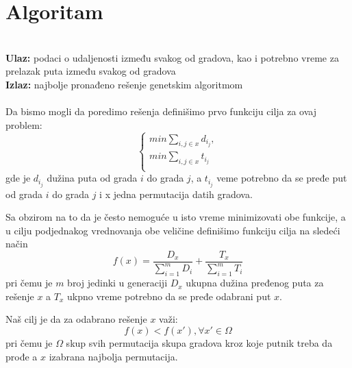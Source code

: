 \documentclass[a4paper]{article}
\begin{document}
\section{Algoritam}
\\
\textbf{Ulaz:} podaci o udaljenosti između svakog od gradova, kao i potrebno vreme za prelazak puta između svakog od gradova
\\
\textbf{Izlaz:} najbolje pronađeno rešenje genetskim algoritmom
\\
\\
Da bismo mogli da poredimo rešenja definišimo prvo funkciju cilja za ovaj problem:
\[ 
  \begin{cases}
    min \sum_{i,j \in x}^{} d_i_j ,  \\
    min \sum_{i,j \in x}^{} t_i_j\\
  \end{cases}
\]
gde je $d_i_j$ dužina puta od grada $i$ do grada $j$, a $t_i_j$ veme potrebno da se pređe put od grada $i$ do grada $j$ i x jedna permutacija datih gradova.\par
Sa obzirom na to da je često nemoguće u isto vreme minimizovati obe funkcije, a u cilju podjednakog vrednovanja obe veličine definišimo funkciju cilja na sledeći način
$$ f(x)=\frac{D_x}{\sum_{i=1}^{m} D_i} + \frac{T_x}{\sum_{i=1}^{m} T_i}$$
pri čemu je $m$ broj jedinki u generaciji $D_x$ ukupna dužina pređenog puta za rešenje $x$ a $T_x$ ukpno vreme potrebno da se pređe odabrani put $x$.\par
Naš cilj je da za odabrano rešenje $x$ važi:
$$f(x)<f(x') , \forall x' \in \Omega $$
pri čemu je $\Omega$ skup svih permutacija skupa gradova kroz koje putnik treba da prođe a $x$ izabrana najbolja permutacija.\par
\newpage
\end{document}
